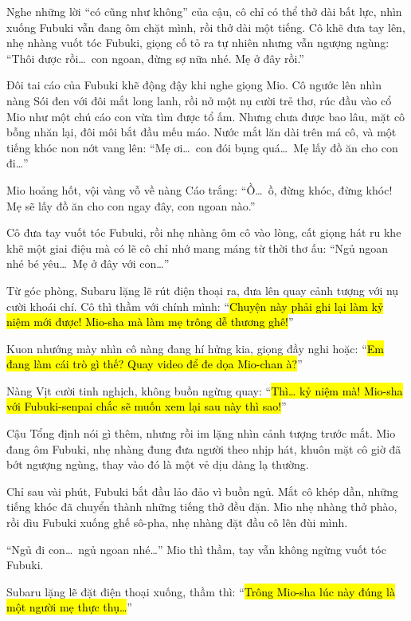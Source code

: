 \documentclass[../main.tex]{subfiles}
\begin{document}
Nghe những lời ``có cũng như không'' của cậu, cô chỉ có thể thở dài bất lực, nhìn xuống Fubuki vẫn đang ôm chặt mình, rồi thở dài một tiếng. Cô khẽ đưa tay lên, nhẹ nhàng vuốt tóc Fubuki, giọng cố tỏ ra tự nhiên nhưng vẫn ngượng ngùng: ``Thôi được rồi\dots\ con ngoan, đừng sợ nữa nhé. Mẹ ở đây rồi.''

Đôi tai cáo của Fubuki khẽ động đậy khi nghe giọng Mio. Cô ngước lên nhìn nàng Sói đen với đôi mắt long lanh, rồi nở một nụ cười trẻ thơ, rúc đầu vào cổ Mio như một chú cáo con vừa tìm được tổ ấm. Nhưng chưa được bao lâu, mặt cô bỗng nhăn lại, đôi môi bắt đầu mếu máo. Nước mắt lăn dài trên má cô, và một tiếng khóc non nớt vang lên: ``Mẹ ơi\dots\ con đói bụng quá\dots\ Mẹ lấy đồ ăn cho con đi\dots''

Mio hoảng hốt, vội vàng vỗ về nàng Cáo trắng: ``Ồ\dots\ ồ, đừng khóc, đừng khóc! Mẹ sẽ lấy đồ ăn cho con ngay đây, con ngoan nào.''

Cô đưa tay vuốt tóc Fubuki, rồi nhẹ nhàng ôm cô vào lòng, cất giọng hát ru khe khẽ một giai điệu mà có lẽ cô chỉ nhớ mang máng từ thời thơ ấu: ``Ngủ ngoan nhé bé yêu\dots\ Mẹ ở đây với con\dots''

Từ góc phòng, Subaru lặng lẽ rút điện thoại ra, đưa lên quay cảnh tượng với nụ cười khoái chí. Cô thì thầm với chính mình: ``\hl{Chuyện này phải ghi lại làm kỷ niệm mới được! Mio-sha mà làm mẹ trông dễ thương ghê!}''

Kuon nhướng mày nhìn cô nàng đang hí hửng kia, giọng đầy nghi hoặc: ``\hl{Em đang làm cái trò gì thế? Quay video để đe dọa Mio-chan à?}''

Nàng Vịt cười tinh nghịch, không buồn ngừng quay: ``\hl{Thì\dots{} kỷ niệm mà! Mio-sha với Fubuki-senpai chắc sẽ muốn xem lại sau này thì sao!}''

Cậu Tổng định nói gì thêm, nhưng rồi im lặng nhìn cảnh tượng trước mắt. Mio đang ôm Fubuki, nhẹ nhàng đung đưa người theo nhịp hát, khuôn mặt cô giờ đã bớt ngượng ngùng, thay vào đó là một vẻ dịu dàng lạ thường.

Chỉ sau vài phút, Fubuki bắt đầu lảo đảo vì buồn ngủ. Mắt cô khép dần, những tiếng khóc đã chuyển thành những tiếng thở đều đặn. Mio nhẹ nhàng thở phào, rồi dìu Fubuki xuống ghế sô-pha, nhẹ nhàng đặt đầu cô lên đùi mình.

``Ngủ đi con\dots\ ngủ ngoan nhé\dots'' Mio thì thầm, tay vẫn không ngừng vuốt tóc Fubuki.

Subaru lặng lẽ đặt điện thoại xuống, thầm thì: ``\hl{Trông Mio-sha lúc này đúng là một người mẹ thực thụ\dots}''
\end{document}
